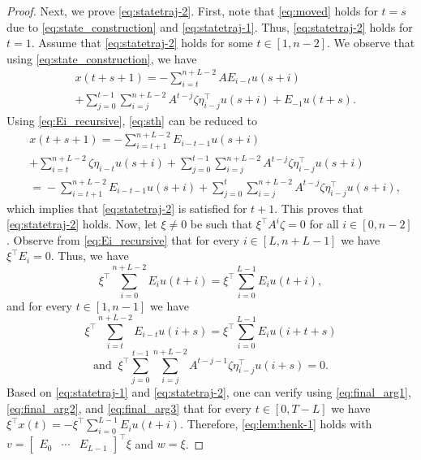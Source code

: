 \documentclass[journal,twoside,web]{ieeecolor}
\begin{document}
\begin{proof}
Next, we prove \eqref{eq:statetraj-2}. First, note that \eqref{eq:moved} holds for $t=s$ due to \eqref{eq:state_construction} and \eqref{eq:statetraj-1}. Thus, \eqref{eq:statetraj-2} holds for $t=1$. Assume that \eqref{eq:statetraj-2} holds for some $t\in[1,n-2]$. We observe that using \eqref{eq:state_construction}, we have
\begin{equation}
\label{eq:sth}
\begin{split}
&x(t+s+1)=-\sum_{i=t}^{n+L-2}AE_{i-t} u(s+i) \\ &+\sum_{j=0}^{t-1}\sum_{i=j}^{n+L-2} A^{t-j}\zeta\eta_{i-j}^\top u(s+i)+E_{-1}u(t+s).
\end{split}
\end{equation}
Using \eqref{eq:Ei_recursive}, \eqref{eq:sth} can be reduced to
\begin{equation}
\begin{split}
&x(t+s+1)=-\sum_{i=t+1}^{n+L-2}E_{i-t-1} u(s+i) \\ &+\sum_{i=t}^{n+L-2}\zeta\eta_{i-t} u(s+i)+\sum_{j=0}^{t-1}\sum_{i=j}^{n+L-2} A^{t-j}\zeta\eta_{i-j}^\top u(s+i) \\
&=\!-\!\!\sum_{i=t+1}^{n+L-2}\!E_{i-t-1} u(s\!+\!i)+\sum_{j=0}^{t}\sum_{i=j}^{n+L-2}\! A^{t-j}\zeta\eta_{i-j}^\top u(s\!+\!i),
\end{split}
\end{equation}
which implies that \eqref{eq:statetraj-2} is satisfied for $t+1$. This proves that \eqref{eq:statetraj-2} holds. Now, let $\xi\neq 0$ be such that $\xi^\top A^i \zeta=0$ for all $i\in[0,n-2]$. Observe from \eqref{eq:Ei_recursive} that for every $i\in[L,n+L-1]$ we have $\xi^\top E_i=0$. Thus, we have
\begin{equation}
\label{eq:final_arg1}
\xi^\top\sum_{i=0}^{n+L-2} E_i u(t+i)=\xi^\top\sum_{i=0}^{L-1} E_i u(t+i),
\end{equation}
and for every $t\in[1,n-1]$ we have
\begin{equation}
\label{eq:final_arg2}
\xi^\top\sum_{i=t}^{n+L-2}E_{i-t} u(i+s)=\xi^\top\sum_{i=0}^{L-1} E_i u(i+t+s)
\end{equation}
\begin{equation}
\label{eq:final_arg3}
\text{and }\ \xi^\top\sum_{j=0}^{t-1}\sum_{i=j}^{n+L-2} \!\!A^{t-j-1}\zeta\eta_{i-j}^\top u(i+s)=0.
\end{equation}
Based on \eqref{eq:statetraj-1} and \eqref{eq:statetraj-2}, one can verify using \eqref{eq:final_arg1}, \eqref{eq:final_arg2}, and \eqref{eq:final_arg3} that for every $t\in[0,T-L]$ we have \mbox{$\xi^\top x(t)=-\xi^\top \sum_{i=0}^{L-1} E_i u(t+i)$}. Therefore, \eqref{eq:lem:henk-1} holds with $v=\begin{bmatrix}
E_0 & \cdots & E_{L-1}
\end{bmatrix}^\top \xi$ and $w=\xi$.
\end{proof}
\end{document}
